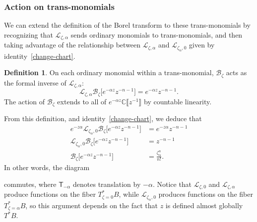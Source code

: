 \documentclass{article}
\newcommand{\C}{\mathbb{C}}
\newcommand{\laplace}{\mathcal{L}}
\newcommand{\borel}{\mathcal{B}}
\theoremstyle{definition}
\newtheorem{definition}{Definition}[section]
\theoremstyle{plain}
\begin{document}
\subsubsection{Action on trans-monomials}\label{sec:action_transseries}
%
We can extend the definition of the Borel transform to these trans-monomials by recognizing that $\laplace_{\zeta, \alpha}$ sends ordinary monomials to trans-monomials, and then taking advantage of the relationship between $\laplace_{\zeta, \alpha}$ and $\laplace_{\zeta_\alpha, 0}$ given by identity~\eqref{change-chart}.
\begin{definition}
On each ordinary monomial within a trans-monomial, $\borel_\zeta$ acts as the formal inverse of $\laplace_{\zeta,\alpha}$:
\[\laplace_{\zeta,\alpha}\borel_\zeta\big[e^{-\alpha z} z^{-n-1} \big]=e^{-\alpha z} z^{-n-1}. \]
The action of $\borel_\zeta$ extends to all of $e^{-\alpha z} \C\llbracket z^{-1} \rrbracket$ by countable linearity.
\end{definition}
From this definition, and identity~\eqref{change-chart}, we deduce that
\begin{align*}
e^{-z\alpha}\laplace_{\zeta_\alpha,0}\borel_\zeta\big[e^{-\alpha z} z^{-n-1}\big] & = e^{-z\alpha} z^{-n-1} \\
\laplace_{\zeta_\alpha,0}\borel_\zeta\big[e^{-\alpha z} z^{-n-1}\big] & = z^{-n-1} \\
\borel_{\zeta}\big[e^{-\alpha z}z^{-n-1}\big] & = \frac{\zeta_\alpha^n}{n!}.
\end{align*}
In other words, the diagram 
\begin{center}
\end{center}
commutes, where $\mathsf{T}_{-\alpha}$ denotes translation by $-\alpha$. Notice that $\laplace_{\zeta, 0}$ and $\laplace_{\zeta, \alpha}$ produce functions on the fiber $T^*_{\zeta = 0}B$, while $\laplace_{\zeta_\alpha, 0}$ produces functions on the fiber $T^*_{\zeta = \alpha}B$, so this argument depends on the fact that $z$ is defined almost globally $T^*B$.
\end{document}
